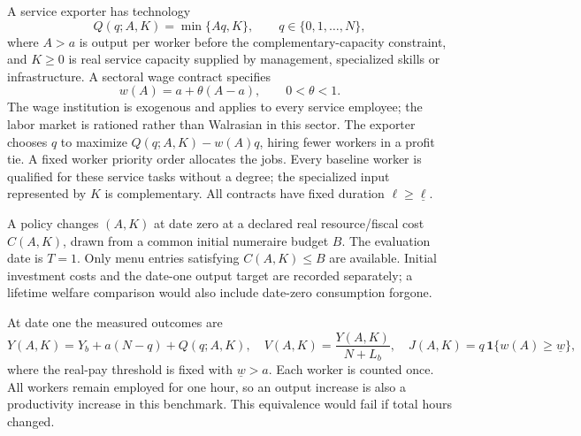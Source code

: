 \documentclass[11pt,a4paper]{article}
\theoremstyle{definition}
\theoremstyle{remark}
\newcommand{\ind}{\mathbf 1}
\begin{document}
A service exporter has technology
\[
 Q(q;A,K)=\min\{Aq,K\},\qquad q\in\{0,1,\ldots,N\},
\]
where $A>a$ is output per worker before the complementary-capacity constraint, and $K\geq0$ is real service capacity supplied by management, specialized skills or infrastructure. A sectoral wage contract specifies
\[
 w(A)=a+\theta(A-a),\qquad 0<\theta<1.
\]
The wage institution is exogenous and applies to every service employee; the labor market is rationed rather than Walrasian in this sector. The exporter chooses $q$ to maximize $Q(q;A,K)-w(A)q$, hiring fewer workers in a profit tie. A fixed worker priority order allocates the jobs. Every baseline worker is qualified for these service tasks without a degree; the specialized input represented by $K$ is complementary. All contracts have fixed duration $\ell\geq\underline\ell$.

A policy changes $(A,K)$ at date zero at a declared real resource/fiscal cost $C(A,K)$, drawn from a common initial numeraire budget $B$. The evaluation date is $T=1$. Only menu entries satisfying $C(A,K)\leq B$ are available. Initial investment costs and the date-one output target are recorded separately; a lifetime welfare comparison would also include date-zero consumption forgone.

At date one the measured outcomes are
\begin{equation}\label{eq:outcomes}
 Y(A,K)=Y_b+a(N-q)+Q(q;A,K),\quad
 V(A,K)=\frac{Y(A,K)}{N+L_b},\quad
 J(A,K)=q\,\ind\{w(A)\geq\underline w\},
\end{equation}
where the real-pay threshold is fixed with $\underline w>a$. Each worker is counted once. All workers remain employed for one hour, so an output increase is also a productivity increase in this benchmark. This equivalence would fail if total hours changed.
\end{document}
